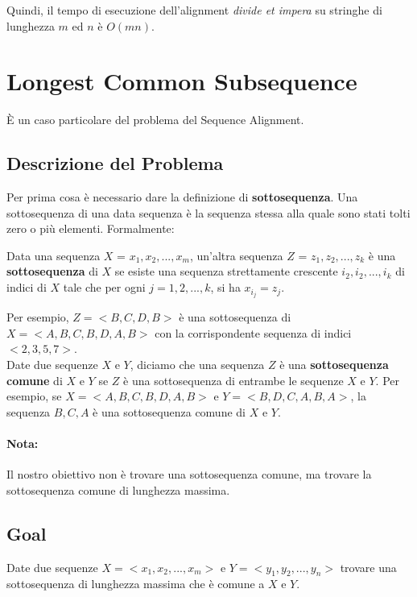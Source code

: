 Quindi, il tempo di esecuzione dell'alignment \emph{divide et impera} su
stringhe di lunghezza $m$ ed $n$ è $O(mn)$.

\section{Longest Common Subsequence}

È un caso particolare del problema del Sequence Alignment.

\subsection{Descrizione del Problema}

Per prima cosa è necessario dare la definizione di
\textbf{sottosequenza}. Una sottosequenza di una data sequenza è la
sequenza stessa alla quale sono stati tolti zero o più elementi.
Formalmente:\\

\begin{minipage}{\textwidth}
  \begin{myblockquote}
    Data una sequenza $X$ =
    $x_1, x_2, ..., x_m$, un'altra sequenza $Z$ = $z_1, z_2, ..., z_k$
    è una \textbf{sottosequenza} di $X$ se esiste una sequenza
    strettamente crescente $i_2, i_2, ..., i_k$ di indici di $X$ tale
    che per ogni $j = 1, 2, ..., k$, si ha $x_{i_j} = z_j$.
  \end{myblockquote}
\end{minipage}

Per esempio, $Z = <B, C, D, B>$ è una sottosequenza di
$X = < A, B, C, B, D, A, B>$ con la corrispondente sequenza di indici
$<2, 3, 5, 7>$.\\

Date due sequenze $X$ e $Y$, diciamo che una sequenza $Z$ è una
\textbf{sottosequenza comune} di $X$ e $Y$ se $Z$ è una
sottosequenza di entrambe le sequenze $X$ e $Y$. Per esempio, se
$X = <A,B,C,B,D,A,B>$ e $Y = <B,D,C,A,B,A>$, la sequenza $B,C,A$ è
una sottosequenza comune di $X$ e $Y$.

\paragraph*{Nota:} Il nostro obiettivo non è trovare una
sottosequenza comune, ma trovare la sottosequenza comune di lunghezza
massima.

\subsection{Goal}
\begin{myblockquote}
  Date due sequenze $X = <x_1, x_2, ..., x_m>$ e $Y = <y_1, y_2, ..., y_n>$
  trovare una sottosequenza di lunghezza massima che è comune a $X$ e $Y$.
\end{myblockquote}

